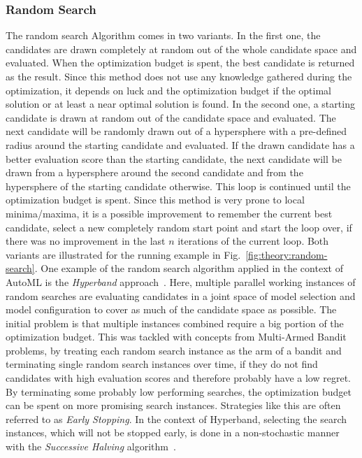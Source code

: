 \subsubsection{Random Search}
\label{sec:theory:optimization:search:random}
The random search Algorithm comes in two variants.
In the first one, the candidates are drawn completely at random out of the whole candidate space and evaluated.
When the optimization budget is spent, the best candidate is returned as the result.
Since this method does not use any knowledge gathered during the optimization, it depends on luck and the optimization budget if the optimal solution or at least a near optimal solution is found.\newline
In the second one, a starting candidate is drawn at random out of the candidate space and evaluated.
The next candidate will be randomly drawn out of a hypersphere with a pre-defined radius around the starting candidate and evaluated.
If the drawn candidate has a better evaluation score than the starting candidate, the next candidate will be drawn from a hypersphere around the second candidate and from the hypersphere of the starting candidate otherwise.
This loop is continued until the optimization budget is spent. Since this method is very prone to local minima/maxima, it is a possible improvement to remember the current best candidate, select a new completely random start point and start the loop over, if there was no improvement in the last $n$ iterations of the current loop.
Both variants are illustrated for the running example in Fig.~\ref{fig:theory:random-search}.\newline
One example of the random search algorithm applied in the context of AutoML is the \textit{Hyperband} approach~\cite{Li-Hyperband}.
Here, multiple parallel working instances of random searches are evaluating candidates in a joint space of model selection and model configuration to cover as much of the candidate space as possible.
The initial problem is that multiple instances combined require a big portion of the optimization budget.
This was tackled with concepts from Multi-Armed Bandit problems, by treating each random search instance as the arm of a bandit and terminating single random search instances over time, if they do not find candidates with high evaluation scores and therefore probably have a low regret.
By terminating some probably low performing searches, the optimization budget can be spent on more promising search instances.
Strategies like this are often referred to as \textit{Early Stopping}.
In the context of Hyperband, selecting the search instances, which will not be stopped early, is done in a non-stochastic manner with the \textit{Successive Halving} algorithm~\cite{Jamieson-SuccessiveHalving}.
